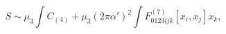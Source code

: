 \begin{equation}
S \sim \mu_3 \int C_{(4)} + \mu_3 (2 \pi \alpha')^2 \int F_{0123ijk}^{(7)} [x_i,x_j ] x_k,
\end{equation}

